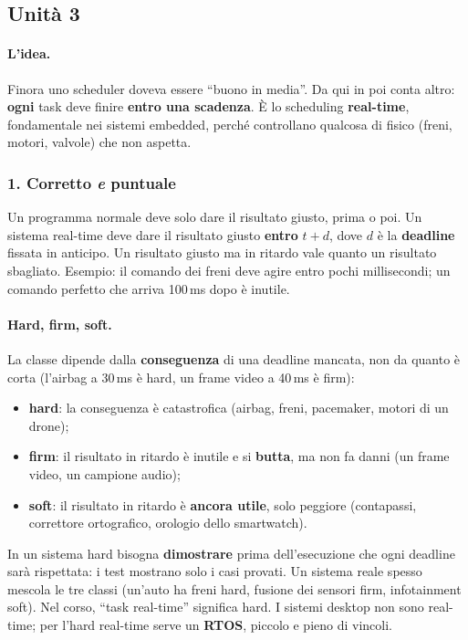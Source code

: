 \subsection{Unità 3}

\paragraph*{L'idea.} Finora uno scheduler doveva essere ``buono in media''. Da qui in poi conta altro: \textbf{ogni} task deve finire \textbf{entro una scadenza}. È lo scheduling \textbf{real-time}, fondamentale nei sistemi embedded, perché controllano qualcosa di fisico (freni, motori, valvole) che non aspetta.

\subsubsection*{1. Corretto \emph{e} puntuale}
Un programma normale deve solo dare il risultato giusto, prima o poi. Un sistema real-time deve dare il risultato giusto \textbf{entro} $t + d$, dove $d$ è la \textbf{deadline} fissata in anticipo. Un risultato giusto ma in ritardo vale quanto un risultato sbagliato. Esempio: il comando dei freni deve agire entro pochi millisecondi; un comando perfetto che arriva 100\,ms dopo è inutile.

\paragraph*{Hard, firm, soft.} La classe dipende dalla \textbf{conseguenza} di una deadline mancata, non da quanto è corta (l'airbag a 30\,ms è hard, un frame video a 40\,ms è firm):
\begin{itemize}
    \item \textbf{hard}: la conseguenza è catastrofica (airbag, freni, pacemaker, motori di un drone);
    \item \textbf{firm}: il risultato in ritardo è inutile e si \textbf{butta}, ma non fa danni (un frame video, un campione audio);
    \item \textbf{soft}: il risultato in ritardo è \textbf{ancora utile}, solo peggiore (contapassi, correttore ortografico, orologio dello smartwatch).
\end{itemize}
In un sistema hard bisogna \textbf{dimostrare} prima dell'esecuzione che ogni deadline sarà rispettata: i test mostrano solo i casi provati. Un sistema reale spesso mescola le tre classi (un'auto ha freni hard, fusione dei sensori firm, infotainment soft). Nel corso, ``task real-time'' significa hard. I sistemi desktop non sono real-time; per l'hard real-time serve un \textbf{RTOS}, piccolo e pieno di vincoli.

